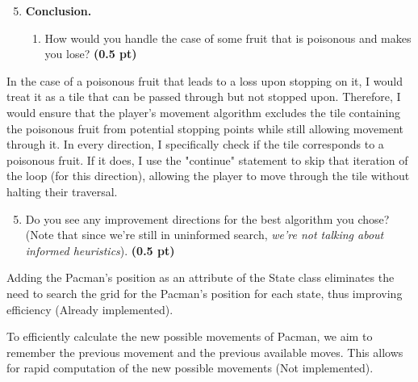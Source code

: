 \documentclass[11pt,a4paper]{../template/report}
\begin{document}
\begin{enumerate}
\setcounter{enumi}{4}
\item \textbf{Conclusion.}
\begin{enumerate}
        \item How would you handle the case of some fruit that is poisonous and makes
you lose?
\textbf{(0.5 pt)}
\end{enumerate}

\end{enumerate}

\begin{answer}
In the case of a poisonous fruit that leads to a loss upon stopping on it, I would treat it as a tile that can be passed through but not stopped upon. Therefore, I would ensure that the player's movement algorithm excludes the tile containing the poisonous fruit from potential stopping points while still allowing movement through it. In every direction, I specifically check if the tile corresponds to a poisonous fruit. If it does, I use the "continue" statement to skip that iteration of the loop (for this direction), allowing the player to move through the tile without halting their traversal.
\end{answer}

\begin{enumerate}
\setcounter{enumi}{4}
\begin{enumerate}
\setcounter{enumii}{4}
        \item  Do you see any improvement directions for the best algorithm you chose? (Note that since we're still in uninformed search, \textit{we're not talking about informed heuristics}). \textbf{(0.5 pt)}
\end{enumerate}

\end{enumerate}

\begin{answer}
Adding the Pacman's position as an attribute of the State class eliminates the need to search the grid for the Pacman's position for each state, thus improving efficiency (Already implemented).

To efficiently calculate the new possible movements of Pacman, we aim to remember the previous movement and the previous available moves. This allows for rapid computation of the new possible movements (Not implemented).
\end{answer}
\end{document}

